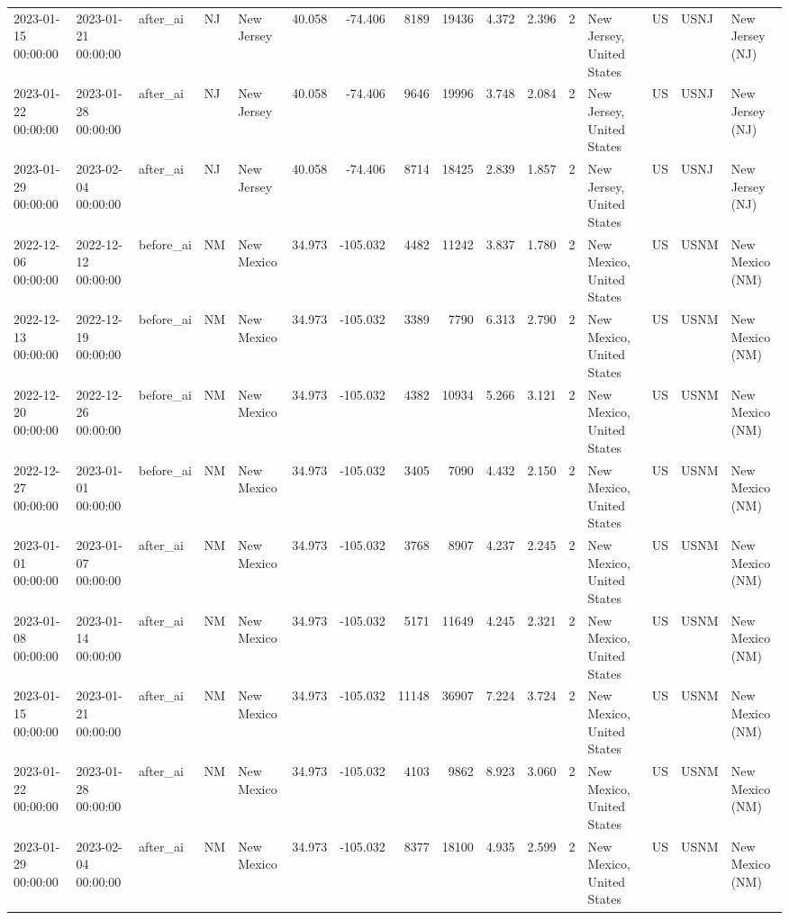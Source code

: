 \begin{tabular}{lllllrrrrrrlllll}
2023-01-15 00:00:00 & 2023-01-21 00:00:00 & after\_ai & NJ & New Jersey & 40.058 & -74.406 & 8189 & 19436 & 4.372 & 2.396 & 2 & New Jersey, United States & US & USNJ & New Jersey (NJ) \\
2023-01-22 00:00:00 & 2023-01-28 00:00:00 & after\_ai & NJ & New Jersey & 40.058 & -74.406 & 9646 & 19996 & 3.748 & 2.084 & 2 & New Jersey, United States & US & USNJ & New Jersey (NJ) \\
2023-01-29 00:00:00 & 2023-02-04 00:00:00 & after\_ai & NJ & New Jersey & 40.058 & -74.406 & 8714 & 18425 & 2.839 & 1.857 & 2 & New Jersey, United States & US & USNJ & New Jersey (NJ) \\
2022-12-06 00:00:00 & 2022-12-12 00:00:00 & before\_ai & NM & New Mexico & 34.973 & -105.032 & 4482 & 11242 & 3.837 & 1.780 & 2 & New Mexico, United States & US & USNM & New Mexico (NM) \\
2022-12-13 00:00:00 & 2022-12-19 00:00:00 & before\_ai & NM & New Mexico & 34.973 & -105.032 & 3389 & 7790 & 6.313 & 2.790 & 2 & New Mexico, United States & US & USNM & New Mexico (NM) \\
2022-12-20 00:00:00 & 2022-12-26 00:00:00 & before\_ai & NM & New Mexico & 34.973 & -105.032 & 4382 & 10934 & 5.266 & 3.121 & 2 & New Mexico, United States & US & USNM & New Mexico (NM) \\
2022-12-27 00:00:00 & 2023-01-01 00:00:00 & before\_ai & NM & New Mexico & 34.973 & -105.032 & 3405 & 7090 & 4.432 & 2.150 & 2 & New Mexico, United States & US & USNM & New Mexico (NM) \\
2023-01-01 00:00:00 & 2023-01-07 00:00:00 & after\_ai & NM & New Mexico & 34.973 & -105.032 & 3768 & 8907 & 4.237 & 2.245 & 2 & New Mexico, United States & US & USNM & New Mexico (NM) \\
2023-01-08 00:00:00 & 2023-01-14 00:00:00 & after\_ai & NM & New Mexico & 34.973 & -105.032 & 5171 & 11649 & 4.245 & 2.321 & 2 & New Mexico, United States & US & USNM & New Mexico (NM) \\
2023-01-15 00:00:00 & 2023-01-21 00:00:00 & after\_ai & NM & New Mexico & 34.973 & -105.032 & 11148 & 36907 & 7.224 & 3.724 & 2 & New Mexico, United States & US & USNM & New Mexico (NM) \\
2023-01-22 00:00:00 & 2023-01-28 00:00:00 & after\_ai & NM & New Mexico & 34.973 & -105.032 & 4103 & 9862 & 8.923 & 3.060 & 2 & New Mexico, United States & US & USNM & New Mexico (NM) \\
2023-01-29 00:00:00 & 2023-02-04 00:00:00 & after\_ai & NM & New Mexico & 34.973 & -105.032 & 8377 & 18100 & 4.935 & 2.599 & 2 & New Mexico, United States & US & USNM & New Mexico (NM) \\

\end{tabular}
